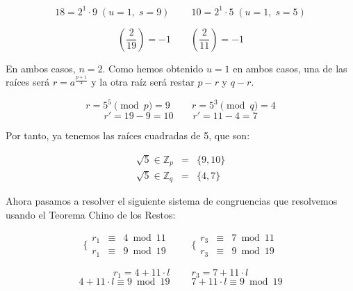 \documentclass[10pt,spanish]{article}
\begin{document}
\begin{description}
    \begin{displaymath}
        18 = 2^1 \cdot 9 \; (u=1, \; s=9) \qquad\ 10 = 2^1 \cdot 5 \; (u=1, \; s=5)
    \end{displaymath}

    \begin{displaymath}
        \left(\frac{2}{19}\right) = -1 \qquad \left(\frac{2}{11}\right) = -1
    \end{displaymath}

    En ambos casos, $n = 2$. Como hemos obtenido $u = 1$ en ambos casos, una de las raíces será $r = a^{\frac{p+1}{4}}$ y la otra raíz será restar $p - r$ y $q - r$.

    \begin{displaymath}
        r = 5^5 \pmod p = 9 \qquad\ r = 5^3 \pmod q = 4
    \end{displaymath}
    \begin{displaymath}
        r' = 19 - 9 = 10 \qquad r' = 11 - 4 = 7
    \end{displaymath}

    Por tanto, ya tenemos las raíces cuadradas de 5, que son:

    \begin{displaymath}
    \begin{matrix}
        \sqrt{5} \in \mathbb{Z}_p & = & \{9,10\} \\
        \sqrt{5} \in \mathbb{Z}_q & = & \{4,7\}
    \end{matrix}
    \end{displaymath}

    Ahora pasamos a resolver el siguiente sistema de congruencias que resolvemos usando el Teorema Chino de los Restos:

    \begin{displaymath}
    \Bigg\{ \begin{matrix}
    r_1 & \equiv & 4 \bmod 11 \\
    r_1 & \equiv & 9 \bmod 19 
    \end{matrix}
    \qquad\
    \Bigg\{ 
    \begin{matrix}
    r_3 & \equiv & 7 \bmod 11 \\
    r_3 & \equiv & 9 \bmod 19
    \end{matrix}
    \end{displaymath}

    \begin{displaymath}
        r_1 = 4 + 11 \cdot l \qquad\ r_3 = 7 + 11 \cdot l
    \end{displaymath}
    \begin{displaymath}
        4 + 11 \cdot l \equiv 9 \bmod 19 \qquad\ 7 + 11 \cdot l \equiv 9 \bmod 19
    \end{displaymath}


\end{description}
\end{document}
